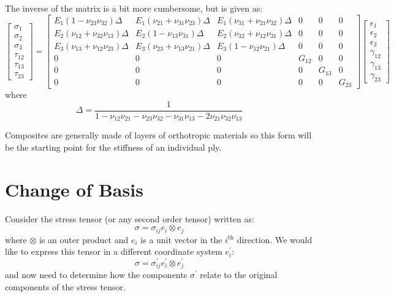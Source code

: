 \documentclass{article}
\begin{document}
The inverse of the matrix is a bit more cumbersome, but is given as:
\begin{equation}
\left[
\begin{matrix}
\sigma_{1}\\
\sigma_{2}\\
\sigma_{3}\\
\tau_{12}\\
\tau_{13}\\
\tau_{23}
\end{matrix}
\right]
=
\left[
\begin{matrix}
E_1(1 - \nu_{23}\nu_{32})\Delta & E_1(\nu_{21} + \nu_{31}\nu_{23})\Delta & E_1(\nu_{31} + \nu_{21}\nu_{32})\Delta & 0 & 0 & 0 \\
E_2(\nu_{12} + \nu_{32}\nu_{13})\Delta & E_2(1 - \nu_{13}\nu_{31})\Delta & E_2(\nu_{32} + \nu_{12}\nu_{31})\Delta & 0 & 0 & 0 \\
E_3(\nu_{13} + \nu_{12}\nu_{23})\Delta & E_3(\nu_{23} + \nu_{13}\nu_{21})\Delta & E_3(1 - \nu_{12}\nu_{21})\Delta & 0 & 0 & 0 \\
0 & 0 & 0 & G_{12} & 0 & 0 \\
0 & 0 & 0 & 0 & G_{13} & 0 \\
0 & 0 & 0 & 0 & 0 & G_{23}
\end{matrix}
\right]
\left[
\begin{matrix}
\epsilon_{1}\\
\epsilon_{2}\\
\epsilon_{3}\\
\gamma_{12}\\
\gamma_{13}\\
\gamma_{23}
\end{matrix}
\right]
\label{eq:orthostiffness}
\end{equation}
where
\begin{equation}
\Delta = \frac{1}{1 - \nu_{12}\nu_{21} - \nu_{23}\nu_{32} - \nu_{31}\nu_{13} - 2\nu_{21}\nu_{32}\nu_{13}}
\end{equation}

Composites are generally made of layers of orthotropic materials so this form will be the starting point for the stiffness of an individual ply.

\section{Change of Basis}

Consider the stress tensor (or any second order tensor) written as:
\begin{equation}
\sigma = \sigma_{ij} e_i \otimes e_j
\label{eq:unrotated}
\end{equation}
where $\otimes$ is an outer product and $e_i$ is a unit vector in the $i^{\text{th}}$ direction.
We would like to express this tensor in a different coordinate system $e_i^\prime$:
\begin{equation}
    \sigma = \sigma^\prime_{ij} e^\prime_i \otimes e^\prime_j
\end{equation}
and now need to determine how the components $\sigma^\prime$ relate to the original components of the stress tensor.
\end{document}
